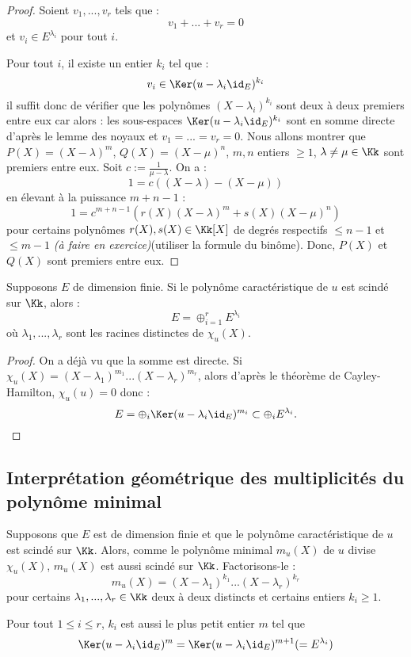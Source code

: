 \documentclass[class=report,crop=false]{standalone}
\newcommand{\exoo}{\emph{(à faire en exercice)}}
\begin{document}
\begin{proof}
Soient $v_1,...,v_r$ tels que :
\[v_1+...+v_r =0\]
et $v_i \in E^{\lambda_i}$ pour tout $i$.

Pour tout $i$, il existe un entier $k_i$ tel que :
\[v_i \in  \Ker (u-\lambda_i\id_E)^{k_i}\]
il suffit donc de vérifier que les polynômes $(X-\lambda_i)^{k_i}$ sont deux à deux premiers entre eux car alors : les sous-espaces $\Ker(u-\lambda_i\id_E)^{k_i}$ sont en somme directe d'après le lemme des noyaux et $v_1=...=v_r = 0$. Nous allons montrer que $P(X) = (X-\lambda)^m$, $Q(X)=(X-\mu)^n$, $m,n$ entiers $\ge 1$, $\lambda\neq\mu \in \Kk$ sont premiers entre eux. Soit $c:= \frac{1}{\mu -\lambda}$. On a :
\[1 = c((X-\lambda) - (X-\mu))\]
en élevant à la puissance $m+n-1$ :
\[1 = c^{m+n-1} (r(X) (X-\lambda)^m +s(X)(X-\mu)^n)\]
pour certains polynômes $r(X),s(X) \in \Kk[X]$ de degrés respectifs $\le n-1$ et $\le m-1$ \exoo (utiliser la formule du binôme). Donc, $P(X)$ et $Q(X)$ sont premiers entre eux.  
\end{proof}

\begin{theoreme}
Supposons $E$ de dimension finie. Si le polynôme caractéristique de $u$ est scindé sur $\Kk$, alors :
\[E = \oplus_{i=1}^r E^{\lambda_i}\]
où $\lambda_1,...,\lambda_r$ sont les racines distinctes de $\chi_u(X)$.
\end{theoreme}

\begin{proof}
On a déjà vu que la somme est directe. Si $\chi_u(X) = (X-\lambda_1)^{m_1}...(X-\lambda_r)^{m_r}$, alors d'après le théorème de Cayley-Hamilton, $\chi_u(u) = 0$ donc :
\[E = \oplus_{i}\Ker(u-\lambda_i\id_E)^{m_i} \subset \oplus_{i}E^{\lambda_i}.\]
\end{proof}

\subsection*{Interprétation géométrique des multiplicités du polynôme minimal}

Supposons que $E$ est de dimension finie et que le polynôme caractéristique de $u$ est scindé sur $\Kk$. Alors, comme le polynôme minimal $m_u(X)$ de $u$ divise $\chi_u(X)$, $m_u(X)$ est aussi scindé sur $\Kk$. Factorisons-le :
\[m_u(X) = (X-\lambda_1)^{k_1}...(X-\lambda_r)^{k_r}\]
pour certains $\lambda_1,...,\lambda_r \in \Kk$ deux à deux distincts et certains entiers $k_i \ge 1$.

\begin{theoreme}
Pour tout $1 \le i \le r$, $k_i$ est aussi le plus petit entier $m$ tel que \[\Ker (u-\lambda_i\id_E)^{m} = \Ker (u-\lambda_i\id_E)^{m+1} (= E^{\lambda_i})\]
\end{theoreme}
\end{document}
